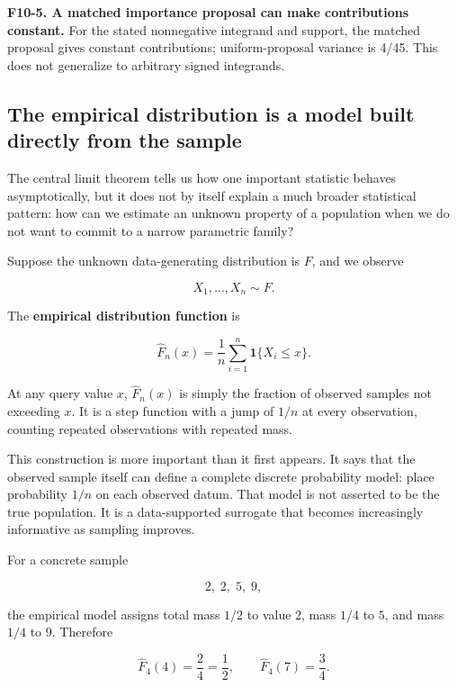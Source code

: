 \textbf{F10-5. A matched importance proposal can make contributions constant.} For the stated nonnegative integrand and support, the matched proposal gives constant contributions; uniform-proposal variance is 4/45. This does not generalize to arbitrary signed integrands.

\subsection{The empirical distribution is a model built directly from the sample}\label{02-foundations-ii-ch030-the-empirical-distribution-is-a-model-built-directly-from-the-sample}

\hypertarget{02-foundations-ii-ch030-the-empirical-distribution-is-a-model-built-directly-from-the-sample}{}

The central limit theorem tells us how one important statistic behaves asymptotically, but it does not by itself explain a much broader statistical pattern: how can we estimate an unknown property of a population when we do not want to commit to a narrow parametric family?

Suppose the unknown data-generating distribution is \(F\), and we observe

\[
X_1,\ldots,X_n\sim F.
\]

The \textbf{empirical distribution function} is

\[
\boxed{
\widehat F_n(x)
=
\frac{1}{n}
\sum_{i=1}^{n}
\mathbf 1\{X_i\le x\}
}.
\]

At any query value \(x\), \(\widehat F_n(x)\) is simply the fraction of observed samples not exceeding \(x\). It is a step function with a jump of \(1/n\) at every observation, counting repeated observations with repeated mass.

This construction is more important than it first appears. It says that the observed sample itself can define a complete discrete probability model: place probability \(1/n\) on each observed datum. That model is not asserted to be the true population. It is a data-supported surrogate that becomes increasingly informative as sampling improves.

For a concrete sample

\[
2,\;2,\;5,\;9,
\]

the empirical model assigns total mass \(1/2\) to value \(2\), mass \(1/4\) to \(5\), and mass \(1/4\) to \(9\). Therefore

\[
\widehat F_4(4)=\frac{2}{4}=\frac12,
\qquad
\widehat F_4(7)=\frac{3}{4}.
\]

